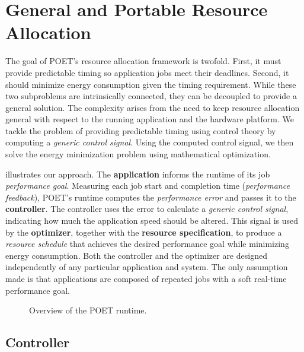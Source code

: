 \section{General and Portable Resource Allocation}
\label{sec:poet-framework}

The goal of POET's resource allocation framework is twofold.
First, it must provide predictable timing so application jobs meet their deadlines.
Second, it should minimize energy consumption given the timing requirement.
While these two subproblems are intrinsically connected, they can be decoupled to provide a general solution.
The complexity arises from the need to keep resource allocation general with respect to the running application and the hardware platform.
We tackle the problem of providing predictable timing using control theory by computing a \emph{generic control signal}.
Using the computed control signal, we then solve the energy minimization problem using mathematical optimization.

 illustrates our approach.
The \textbf{application} informs the runtime of its job \emph{performance goal}.
Measuring each job start and completion time (\emph{performance feedback}), POET's runtime computes the \emph{performance error} and passes it to the \textbf{controller}.
The controller uses the error to calculate a \emph{generic control signal}, indicating how much the application speed should be altered.
This signal is used by the \textbf{optimizer}, together with the \textbf{resource specification}, to produce a \emph{resource schedule} that achieves the desired performance goal while minimizing energy consumption.
Both the controller and the optimizer are designed independently of any particular application and system.
The only assumption made is that applications are composed of repeated jobs with a soft real-time performance goal.

\begin{figure}[t]
  \centering
  
  \caption{Overview of the POET runtime.}
  \label{fig:poet-runtime}
\end{figure}


\subsection{Controller}

